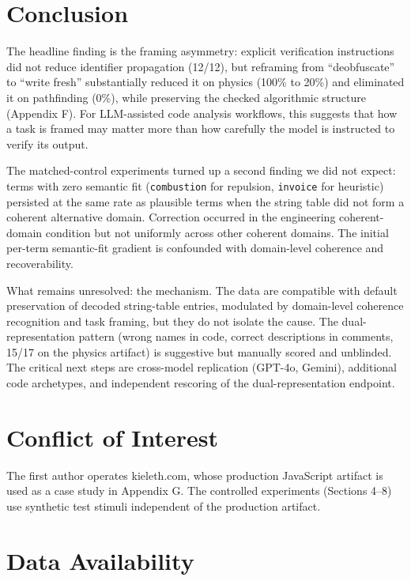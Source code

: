 \documentclass[11pt]{article}
\begin{document}
\section{Conclusion}

The headline finding is the framing asymmetry:
explicit verification instructions did not reduce identifier
propagation (12/12), but reframing from ``deobfuscate'' to ``write
fresh'' substantially reduced it on physics (100\% to 20\%) and
eliminated it on pathfinding (0\%), while preserving the checked
algorithmic structure (Appendix F). For LLM-assisted code analysis
workflows, this suggests that how a task is framed may matter more
than how carefully the model is instructed to verify its output.

The matched-control experiments turned up a second finding we did not
expect: terms with zero semantic fit (\texttt{combustion} for repulsion,
\texttt{invoice} for heuristic) persisted at the same rate as plausible
terms when the string table did not form a coherent alternative
domain. Correction occurred in the engineering coherent-domain
condition but not uniformly across other coherent domains. The
initial per-term semantic-fit gradient is confounded with domain-level coherence and recoverability.

What remains unresolved: the mechanism. The data are compatible with
default preservation of decoded string-table entries, modulated by
domain-level coherence recognition and task framing, but they do not
isolate the cause. The dual-representation pattern (wrong names in
code, correct descriptions in comments, 15/17 on the physics
artifact) is suggestive but manually scored and unblinded. The
critical next steps are cross-model replication (GPT-4o, Gemini),
additional code archetypes, and independent rescoring of the dual-representation endpoint.

\section*{Conflict of Interest}

The first author operates kieleth.com, whose production JavaScript
artifact is used as a case study in Appendix G. The controlled
experiments (Sections 4--8) use synthetic test stimuli independent
of the production artifact.

\section*{Data Availability}
\end{document}
